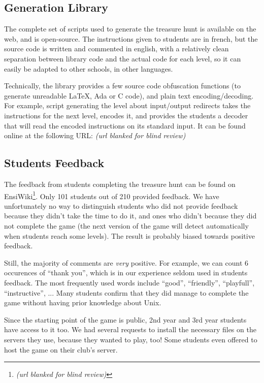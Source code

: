 \documentclass{sig-alternate}
\newcommand{\feedbackurl}[0]{\textit{(url blanked for blind review)}}
\newcommand{\gitoriousproject}[0]{\textit{(url blanked for blind review)}}
\newcommand{\feedbackurl}[0]{{\scriptsize\url{http://ensiwiki.ensimag.fr/index.php/Discussion:TP_Unix_-_Jeu_de_piste}}}
\newcommand{\gitoriousproject}[0]{\url{http://gitorious.org/unix-training}}
\begin{document}
\subsection{Generation Library}

The complete set of scripts used to generate the treasure hunt is
available on the web, and is open-source. The instructions given to
students are in french, but the source code is written and commented
in english, with a relatively clean separation between library code
and the actual code for each level, so it can easily be adapted to
other schools, in other languages.

Technically, the library provides a few source code obfuscation
functions (to generate unreadable \LaTeX{}, Ada or C code), and plain
text encoding/decoding. For example, script generating the level about
input/output redirects takes the instructions for the next level,
encodes it, and provides the students a decoder that will read the
encoded instructions on its standard input.
It can be found online at the following URL:
\gitoriousproject

\subsection{Students Feedback}

The feedback from students completing the treasure hunt can be found
on
EnsiWiki\footnote{\feedbackurl}.
Only 101 students out of 210 provided feedback. We have unfortunately
no way to distinguish students who did not provide feedback because
they didn't take the time to do it, and ones who didn't because they
did not complete the game (the next version of the game will detect
automatically when students reach some levels). The result is probably
biased towards positive feedback.

Still, the majority of comments are \emph{very} positive. For example,
we can count 6 occurences of ``thank you'', which is in our
experience seldom used in students feedback. The most frequently used
words include ``good'', ``friendly'', ``playfull'', ``instructive'', ...
Many students confirm that they did manage to complete the game
without having prior knowledge about Unix.

Since the starting point of the game is public, 2nd year and 3rd year
students have access to it too. We had several requests to install the
necessary files on the servers they use, because they wanted to play,
too! Some students even offered to host the game on their club's
server.
\end{document}
